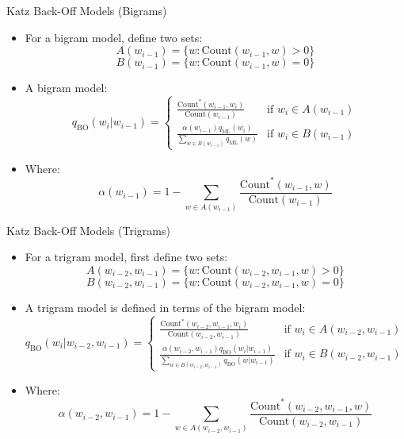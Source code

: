 \documentclass[handout]{beamer}
\begin{document}
\begin{frame}{Katz Back-Off Models (Bigrams)}
    \begin{itemize}
        \item For a bigram model, define two sets:
        \[
        A(w_{i-1}) = \{w : \text{Count}(w_{i-1}, w) > 0\}
        \]
        \[
        B(w_{i-1}) = \{w : \text{Count}(w_{i-1}, w) = 0\}
        \]
        \item A bigram model:
        \[
        q_{\text{BO}}(w_i | w_{i-1}) =
        \begin{cases}
            \frac{\text{Count}^*(w_{i-1}, w_i)}{\text{Count}(w_{i-1})} & \text{if } w_i \in A(w_{i-1}) \\
            \frac{\alpha(w_{i-1}) q_{\text{ML}}(w_i)}{\sum_{w \in B(w_{i-1})} q_{\text{ML}}(w)} & \text{if } w_i \in B(w_{i-1})
        \end{cases}
        \]
        \item Where:
        \[
        \alpha(w_{i-1}) = 1 - \sum_{w \in A(w_{i-1})} \frac{\text{Count}^*(w_{i-1}, w)}{\text{Count}(w_{i-1})}
        \]
    \end{itemize}
\end{frame}

\begin{frame}{Katz Back-Off Models (Trigrams)}
\begin{scriptsize}
    \begin{itemize}
        \item For a trigram model, first define two sets:
        \[
        A(w_{i-2}, w_{i-1}) = \{w : \text{Count}(w_{i-2}, w_{i-1}, w) > 0\}
        \]
        \[
        B(w_{i-2}, w_{i-1}) = \{w : \text{Count}(w_{i-2}, w_{i-1}, w) = 0\}
        \]
        \item A trigram model is defined in terms of the bigram model:
        \[
        q_{\text{BO}}(w_i | w_{i-2}, w_{i-1}) =
        \begin{cases}
            \frac{\text{Count}^*(w_{i-2}, w_{i-1}, w_i)}{\text{Count}(w_{i-2}, w_{i-1})} & \text{if } w_i \in A(w_{i-2}, w_{i-1}) \\
            \frac{\alpha(w_{i-2}, w_{i-1}) q_{\text{BO}}(w_i|w_{i-1})}{\sum_{w \in B(w_{i-2}, w_{i-1})} q_{\text{BO}}(w|w_{i-1})} & \text{if } w_i \in B(w_{i-2}, w_{i-1})
        \end{cases}
        \]
        \item Where:
        \[
        \alpha(w_{i-2}, w_{i-1}) = 1 - \sum_{w \in A(w_{i-2}, w_{i-1})} \frac{\text{Count}^*(w_{i-2}, w_{i-1}, w)}{\text{Count}(w_{i-2}, w_{i-1})}
        \]
    \end{itemize}
    
    \end{scriptsize}
\end{frame}
\end{document}
